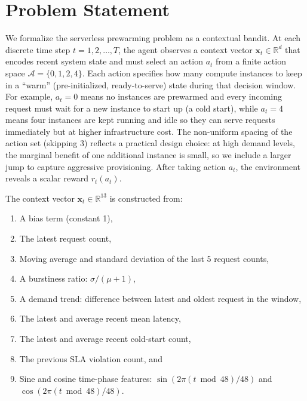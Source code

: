 \documentclass[11pt]{article}
\begin{document}
\section{Problem Statement}

We formalize the serverless prewarming problem as a contextual bandit. At each discrete time step $t = 1, 2, \ldots, T$, the agent observes a context vector $\mathbf{x}_t \in \mathbb{R}^d$ that encodes recent system state and must select an action $a_t$ from a finite action space $\mathcal{A} = \{0, 1, 2, 4\}$. Each action specifies how many compute instances to keep in a ``warm'' (pre-initialized, ready-to-serve) state during that decision window. For example, $a_t = 0$ means no instances are prewarmed and every incoming request must wait for a new instance to start up (a cold start), while $a_t = 4$ means four instances are kept running and idle so they can serve requests immediately but at higher infrastructure cost. The non-uniform spacing of the action set (skipping 3) reflects a practical design choice: at high demand levels, the marginal benefit of one additional instance is small, so we include a larger jump to capture aggressive provisioning. After taking action $a_t$, the environment reveals a scalar reward $r_t(a_t)$.

The context vector $\mathbf{x}_t \in \mathbb{R}^{13}$ is constructed from:
\begin{enumerate}[nosep]
    \item A bias term (constant 1),
    \item The latest request count,
    \item Moving average and standard deviation of the last 5 request counts,
    \item A burstiness ratio: $\sigma / (\mu + 1)$,
    \item A demand trend: difference between latest and oldest request in the window,
    \item The latest and average recent mean latency,
    \item The latest and average recent cold-start count,
    \item The previous SLA violation count, and
    \item Sine and cosine time-phase features: $\sin(2\pi (t \bmod 48)/48)$ and $\cos(2\pi (t \bmod 48)/48)$.
\end{enumerate}
\end{document}
